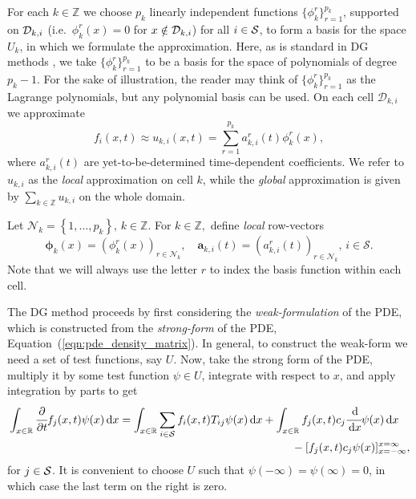 For each \(k\in \mathbb Z\) we choose \(p_k\) linearly independent functions \(\{\phi^r_k\}_{r=1}^{p_k}\), supported on \(\mathcal{D}_{k,i}\) (i.e.~\(\phi^r_k(x)=0\) for \(x\notin\mathcal{D}_{k,i}\)) for all \(i\in\mathcal{S}\), to form a basis for the space \(U_k\), in which we formulate the approximation. Here, as is standard in DG methods \citep{nodalDGBook}, we take \(\{\phi^r_k\}_{r=1}^{p_k}\) to be a basis for the space of polynomials of degree \(p_k-1\). For the sake of illustration, the reader may think of \(\{\phi^r_k\}_{r=1}^{p_k}\) as the Lagrange polynomials, but any polynomial basis can be used. On each cell \(\mathcal D_{k,i}\) we approximate 
\[f_i(x,t)\approx u_{k,i}(x,t)=\sum\limits_{r=1}^{p_k}a_{k,i}^r(t)\phi^r_k(x),\] 
where \(a_{k,i}^r(t)\) are yet-to-be-determined time-dependent coefficients. We refer to \(u_{k,i}\) as the \textit{local} approximation on cell \(k\), while the \textit{global} approximation is given by \(\sum\limits_{k\in\mathbb Z}u_{k,i}\) on the whole domain. %

Let \(\mathcal N_k = \left\{1,\dots,p_k\right\},\, k \in \mathbb Z\). For \(k\in\mathbb Z,\) define \textit{local} row-vectors 
\[\boldsymbol \phi_k(x) = (\phi^r_k(x))_{r\in\mathcal N_k}, \quad \boldsymbol a_{k,i}(t) = (a_{k,i}^r(t))_{r\in\mathcal N_k},\,i\in\mathcal S.\]
Note that we will always use the letter \(r\) to index the basis function within each cell.

The DG method proceeds by first considering the \textit{weak-formulation} of the PDE, which is constructed from the \textit{strong-form} of the PDE, Equation~(\ref{eqn:pde_density_matrix}). In general, to construct the weak-form we need a set of test functions, say \(U\). Now, take the strong form of the PDE, multiply it by some test function \(\psi\in U\), integrate with respect to \(x\), and apply integration by parts to get 
\begin{align}
\begin{multlined}[t]
	\int_{x\in\mathbb R}\cfrac{\partial}{\partial t} f_j(x,t)\psi(x)\wrt x = \int_{x\in\mathbb R} \sum_{i\in\calS}f_i(x,t)T_{ij}\psi(x)\wrt x 
	+  \int_{x\in\mathbb R} f_j(x,t)c_j\cfrac{\wrt}{\wrt x}\psi(x)\wrt x \\{}- [ f_j(x,t)c_j\psi(x)]_{x=-\infty}^{x=\infty}, \end{multlined}\label{eqn:weak form}
\end{align}
for \(j\in\mathcal{S}\). It is convenient to choose \(U\) such that \(\psi(-\infty)=\psi(\infty)=0\), in which case the last term on the right is zero. %

